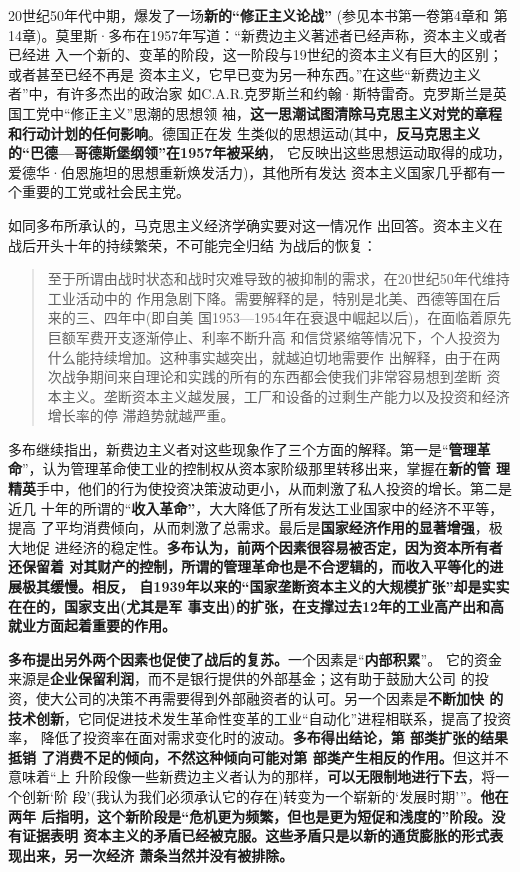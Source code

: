 20世纪50年代中期，爆发了一场\textbf{新的“修正主义论战”} (参见本书第一卷第4章和
第14章)。莫里斯·多布在1957年写道：“新费边主义著述者已经声称，资本主义或者已经进
入一个新的、变革的阶段，这一阶段与19世纪的资本主义有巨大的区别；或者甚至已经不再是
资本主义，它早已变为另一种东西。”在这些“新费边主义者”中，有许多杰出的政治家
如C.A.R.克罗斯兰和约翰·斯特雷奇。克罗斯兰是英国工党中“修正主义”思潮的思想领
袖，\textbf{这一思潮试图清除马克思主义对党的章程和行动计划的任何影响}。德国正在发
生类似的思想运动(其中，\textbf{反马克思主义的“巴德—哥德斯堡纲领”在1957年被采纳}，
它反映出这些思想运动取得的成功，爱德华·伯恩施坦的思想重新焕发活力)，其他所有发达
资本主义国家几乎都有一个重要的工党或社会民主党。

如同多布所承认的，马克思主义经济学确实要对这一情况作
出回答。资本主义在战后开头十年的持续繁荣，不可能完全归结
为战后的恢复：
\begin{quotation}
  至于所谓由战时状态和战时灾难导致的被抑制的需求，在20世纪50年代维持工业活动中的
  作用急剧下降。需要解释的是，特别是北美、西德等国在后来的三、四年中(即自美
  国1953—1954年在衰退中崛起以后)，在面临着原先巨额军费开支逐渐停止、利率不断升高
  和信贷紧缩等情况下，个人投资为什么能持续增加。这种事实越突出，就越迫切地需要作
  出解释，由于在两次战争期间来自理论和实践的所有的东西都会使我们非常容易想到垄断
  资本主义。垄断资本主义越发展，工厂和设备的过剩生产能力以及投资和经济增长率的停
  滞趋势就越严重。
\end{quotation}
多布继续指出，新费边主义者对这些现象作了三个方面的解释。第一是“\textbf{管理革
  命}”，认为管理革命使工业的控制权从资本家阶级那里转移出来，掌握在\textbf{新的管
  理精英}手中，他们的行为使投资决策波动更小，从而刺激了私人投资的增长。第二是近几
十年的所谓的“\textbf{收入革命”}，大大降低了所有发达工业国家中的经济不平等，提高
了平均消费倾向，从而刺激了总需求。最后是\textbf{国家经济作用的显著增强}，极大地促
进经济的稳定性。\textbf{多布认为，前两个因素很容易被否定，因为资本所有者还保留着
  对其财产的控制，所谓的管理革命也是不合逻辑的，而收入平等化的进展极其缓慢。相反，
  自1939年以来的“国家垄断资本主义的大规模扩张”却是实实在在的，国家支出(尤其是军
  事支出)的扩张，在支撑过去12年的工业高产出和高就业方面起着重要的作用。}

\textbf{多布提出另外两个因素也促使了战后的复苏。}一个因素是“\textbf{内部积累}”。
它的资金来源是\textbf{企业保留利润}，而不是银行提供的外部基金；这有助于鼓励大公司
的投资，使大公司的决策不再需要得到外部融资者的认可。另一个因素是\textbf{不断加快
  的技术创新}，它同促进技术发生革命性变革的工业“自动化”进程相联系，提高了投资率，
降低了投资率在面对需求变化时的波动。\textbf{多布得出结论，第 部类扩张的结果抵销
  了消费不足的倾向，不然这种倾向可能对第 部类产生相反的作用。}但这并不意味着“上
升阶段像一些新费边主义者认为的那样，\textbf{可以无限制地进行下去}，将一个创新‘阶
段’(我认为我们必须承认它的存在)转变为一个崭新的‘发展时期’”。\textbf{他在两年
  后指明，这个新阶段是“危机更为频繁，但也是更为短促和浅度的”阶段。没有证据表明
  资本主义的矛盾已经被克服。这些矛盾只是以新的通货膨胀的形式表现出来，另一次经济
  萧条当然并没有被排除。}


